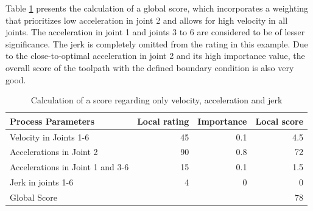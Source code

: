 Table \ref{VAJ} presents the calculation of a global score, which incorporates a weighting that prioritizes low acceleration in joint 2 and allows for high velocity in all joints. The acceleration in joint 1 and joints 3 to 6 are considered to be of lesser significance. The jerk is completely omitted from the rating in this example. Due to the close-to-optimal acceleration in joint 2 and its high importance value, the overall score of the toolpath with the defined boundary condition is also very good.

\begin{table}[H]
	\centering
	\begin{tabular}{||l|r|r|r||}
		Process Parameters & Local rating & Importance & Local score\\
		\hline
		\hline
		\hline
		Velocity in Joints 1-6& 45& 0.1&4.5\\
		Accelerations in Joint 2& 90 & 0.8 & 72\\
		Accelerations in Joint 1 and 3-6 & 15& 0.1&1.5\\
		Jerk in joints 1-6& 4& 0&0\\
		
		\hline
		\hline
		\hline
		Global Score& & &78\\
		\hline
		\hline
	\end{tabular}
	
	\caption{Calculation of a score regarding only velocity, acceleration and jerk}
	\label{VAJ}
\end{table}

